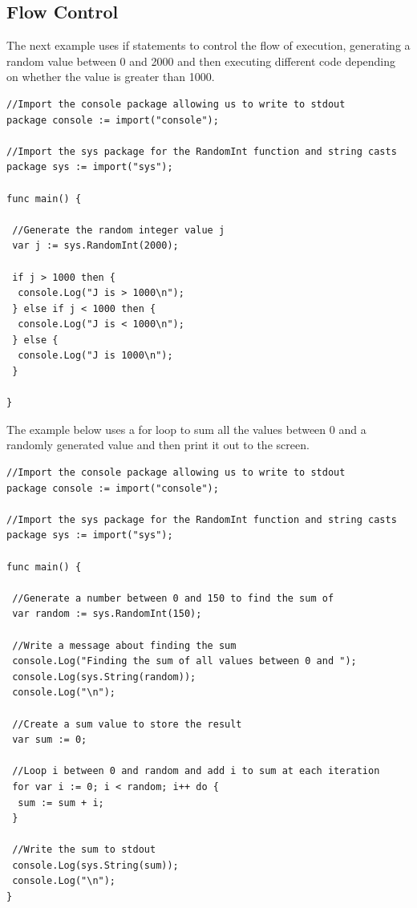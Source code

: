 \documentclass[]{final_report}
\begin{document}
\subsection{Flow Control}

The next example uses if statements to control the flow of execution, generating a random value between 0 and 2000 and then executing different code depending on whether the value is greater than 1000.

\begin{verbatim}
//Import the console package allowing us to write to stdout
package console := import("console");

//Import the sys package for the RandomInt function and string casts
package sys := import("sys");

func main() {

 //Generate the random integer value j
 var j := sys.RandomInt(2000);

 if j > 1000 then {
  console.Log("J is > 1000\n");
 } else if j < 1000 then {
  console.Log("J is < 1000\n");
 } else {
  console.Log("J is 1000\n");
 }

}
\end{verbatim}

The example below uses a for loop to sum all the values between 0 and a randomly generated value and then print it out to the screen.

\begin{verbatim}
//Import the console package allowing us to write to stdout
package console := import("console");

//Import the sys package for the RandomInt function and string casts
package sys := import("sys");

func main() {

 //Generate a number between 0 and 150 to find the sum of
 var random := sys.RandomInt(150);

 //Write a message about finding the sum
 console.Log("Finding the sum of all values between 0 and ");
 console.Log(sys.String(random));
 console.Log("\n");
 
 //Create a sum value to store the result
 var sum := 0;
 
 //Loop i between 0 and random and add i to sum at each iteration
 for var i := 0; i < random; i++ do {
  sum := sum + i;
 }  
 
 //Write the sum to stdout
 console.Log(sys.String(sum));
 console.Log("\n"); 
}
\end{verbatim}
\end{document}
